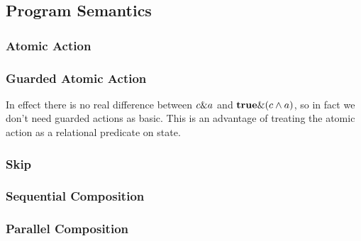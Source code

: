\newpage
\subsection{Program Semantics}

\subsubsection{Atomic Action}



\subsubsection{Guarded Atomic Action}
In effect there is no real difference between $c \& a$
and $\mathbf{true} \& (c \land a)$,
so in fact we don't need guarded actions as basic.
This is an advantage of treating the atomic action as a relational predicate
on state.



\subsubsection{Skip}


\subsubsection{Sequential Composition}


\subsubsection{Parallel Composition}



